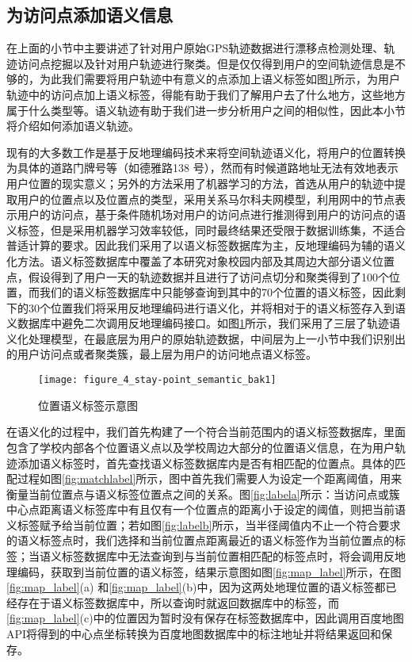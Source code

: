 \subsection{为访问点添加语义信息}
\label{sec:section3-3}
\par 在上面的小节中主要讲述了针对用户原始GPS轨迹数据进行漂移点检测处理、轨迹访问点挖掘以及针对用户轨迹进行聚类。但是仅仅得到用户的空间轨迹信息是不够的，为此我们需要将用户轨迹中有意义的点添加上语义标签如图\ref{fig:tra_senantic}所示，为用户轨迹中的访问点加上语义标签，得能有助于我们了解用户去了什么地方，这些地方属于什么类型等。语义轨迹有助于我们进一步分析用户之间的相似性，因此本小节将介绍如何添加语义轨迹。
\par 现有的大多数工作是基于反地理编码技术来将空间轨迹语义化，将用户的位置转换为具体的道路门牌号等（如德雅路138 号），然而有时候道路地址无法有效地表示用户位置的现实意义；另外的方法采用了机器学习的方法，首选从用户的轨迹中提取用户的位置点以及位置点的类型，采用关系马尔科夫网模型，利用网中的节点表示用户的访问点，基于条件随机场对用户的访问点进行推测得到用户的访问点的语义标签，但是采用机器学习效率较低，同时最终结果还受限于数据训练集，不适合普适计算的要求。因此我们采用了以语义标签数据库为主，反地理编码为辅的语义化方法。语义标签数据库中覆盖了本研究对象校园内部及其周边大部分语义位置点，假设得到了用户一天的轨迹数据并且进行了访问点切分和聚类得到了100个位置，而我们的语义标签数据库中只能够查询到其中的70个位置的语义标签，因此剩下的30个位置我们将采用反地理编码进行语义化，并将相对于的语义标签存入到语义数据库中避免二次调用反地理编码接口。如图\ref{fig:tra_senantic}所示，我们采用了三层了轨迹语义化处理模型，在最底层为用户的原始轨迹数据，中间层为上一小节中我们识别出的用户访问点或者聚类簇，最上层为用户的访问地点语义标签。
\begin{figure}[htp]
\centering
\texttt{[image: figure\_4\_stay-point\_semantic\_bak1]}
\caption{位置语义标签示意图}
\label{fig:tra_senantic}
\end{figure}
\par 在语义化的过程中，我们首先构建了一个符合当前范围内的语义标签数据库，里面包含了学校内部各个位置语义点以及学校周边大部分的位置语义信息，在为用户轨迹添加语义标签时，首先查找语义标签数据库内是否有相匹配的位置点。具体的匹配过程如图\ref{fig:matchlabel}所示，图中首先我们需要人为设定一个距离阈值，用来衡量当前位置点与语义标签位置点之间的关系。图\ref{fig:labela}所示：当访问点或簇中心点距离语义标签库中有且仅有一个位置点的距离小于设定的阈值，则把当前语义标签赋予给当前位置；若如图\ref{fig:labelb}所示，当半径阈值内不止一个符合要求的语义标签点时，我们选择和当前位置点距离最近的语义标签作为当前位置点的标签；当语义标签数据库中无法查询到与当前位置相匹配的标签点时，将会调用反地理编码，获取到当前位置的语义标签，结果示意图如图\ref{fig:map_label}所示，在图\ref{fig:map_label}(a) 和\ref{fig:map_label}(b)中，因为这两处地理位置的语义标签都已经存在于语义标签数据库中，所以查询时就返回数据库中的标签，而\ref{fig:map_label}(c)中的位置因为暂时没有保存在标签数据库中，因此调用百度地图API将得到的中心点坐标转换为百度地图数据库中的标注地址并将结果返回和保存。

